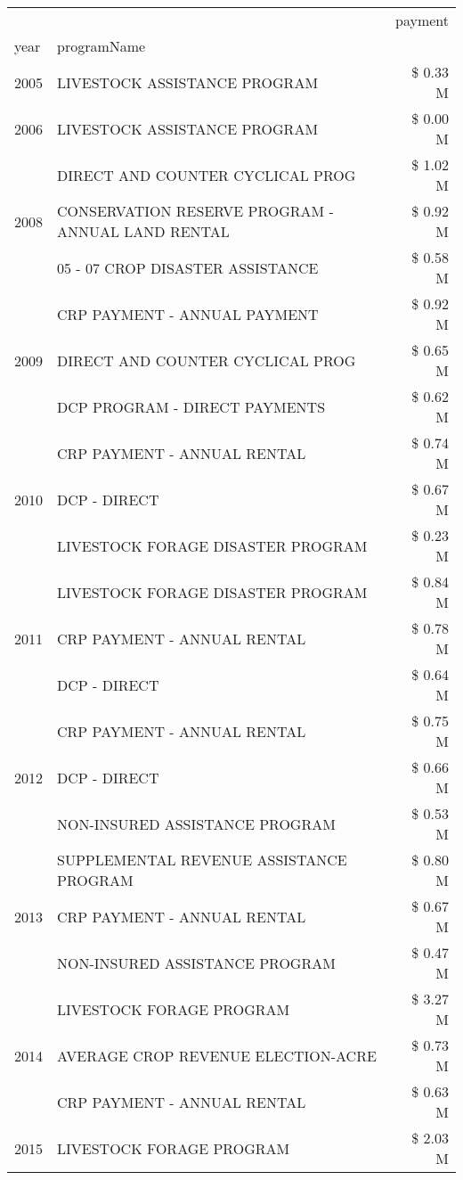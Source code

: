 \begin{tabular}{llr}
\toprule
 &  & payment \\
year & programName &  \\
\midrule
2005 & LIVESTOCK ASSISTANCE PROGRAM & \$ 0.33 M \\
\cline{1-3}
2006 & LIVESTOCK ASSISTANCE PROGRAM & \$ 0.00 M \\
\cline{1-3}
\multirow[t]{3}{*}{2008} & DIRECT AND COUNTER CYCLICAL PROG & \$ 1.02 M \\
 & CONSERVATION RESERVE PROGRAM - ANNUAL LAND RENTAL & \$ 0.92 M \\
 & 05 - 07 CROP DISASTER ASSISTANCE & \$ 0.58 M \\
\cline{1-3}
\multirow[t]{3}{*}{2009} & CRP PAYMENT - ANNUAL PAYMENT & \$ 0.92 M \\
 & DIRECT AND COUNTER CYCLICAL PROG & \$ 0.65 M \\
 & DCP PROGRAM - DIRECT PAYMENTS & \$ 0.62 M \\
\cline{1-3}
\multirow[t]{3}{*}{2010} & CRP PAYMENT - ANNUAL RENTAL & \$ 0.74 M \\
 & DCP - DIRECT & \$ 0.67 M \\
 & LIVESTOCK FORAGE DISASTER PROGRAM & \$ 0.23 M \\
\cline{1-3}
\multirow[t]{3}{*}{2011} & LIVESTOCK FORAGE DISASTER PROGRAM & \$ 0.84 M \\
 & CRP PAYMENT - ANNUAL RENTAL & \$ 0.78 M \\
 & DCP - DIRECT & \$ 0.64 M \\
\cline{1-3}
\multirow[t]{3}{*}{2012} & CRP PAYMENT - ANNUAL RENTAL & \$ 0.75 M \\
 & DCP - DIRECT & \$ 0.66 M \\
 & NON-INSURED ASSISTANCE PROGRAM & \$ 0.53 M \\
\cline{1-3}
\multirow[t]{3}{*}{2013} & SUPPLEMENTAL REVENUE ASSISTANCE PROGRAM & \$ 0.80 M \\
 & CRP PAYMENT - ANNUAL RENTAL & \$ 0.67 M \\
 & NON-INSURED ASSISTANCE PROGRAM & \$ 0.47 M \\
\cline{1-3}
\multirow[t]{3}{*}{2014} & LIVESTOCK FORAGE PROGRAM & \$ 3.27 M \\
 & AVERAGE CROP REVENUE ELECTION-ACRE & \$ 0.73 M \\
 & CRP PAYMENT - ANNUAL RENTAL & \$ 0.63 M \\
\cline{1-3}
\multirow[t]{3}{*}{2015} & LIVESTOCK FORAGE PROGRAM & \$ 2.03 M \\

\end{tabular}
